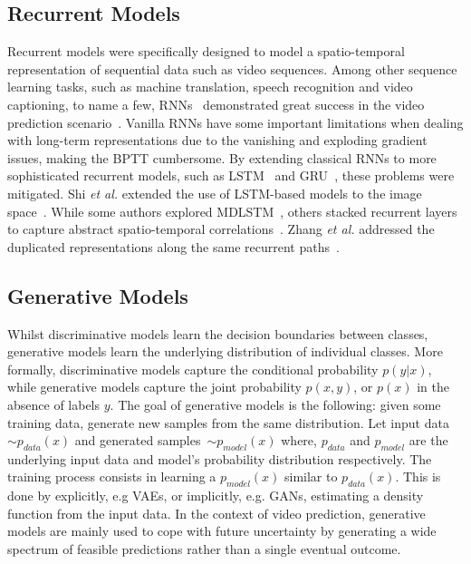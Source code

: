 \subsection{Recurrent Models}
Recurrent models were specifically designed to model a spatio-temporal representation of sequential data such as video sequences. Among other sequence learning tasks, such as machine translation, speech recognition and video captioning, to name a few, \acp{RNN}~\cite{Rumelhart1986} demonstrated great success in the video prediction scenario~\cite{Ranzato2014,Srivastava2015,Shi2015,Lotter2017,Lotter2015,Byeon2018, Zhang2019,Patraucean2015,Lu2017,Villegas2017,Denton2017,Chen2017,Oh2015,Denton2018,Villegas2017,Nabavi2018,Vora2018,Sun2019,Terwilliger2019,Wichers2018,Minderer2019}. Vanilla \acp{RNN} have some important limitations when dealing with long-term representations due to the vanishing and exploding gradient issues, making the \ac{BPTT} cumbersome. By extending classical \acp{RNN} to more sophisticated recurrent models, such as \ac{LSTM}~\cite{Hochreiter1997} and \ac{GRU}~\cite{Cho2014}, these problems were mitigated. Shi \textit{et al.} extended the use of \ac{LSTM}-based models to the image space~\cite{Shi2015}. While some authors explored \ac{MDLSTM}~\cite{Graves2007}, others stacked recurrent layers to capture abstract spatio-temporal correlations~\cite{Lotter2015,Finn2016}. Zhang \textit{et al.} addressed the duplicated representations along the same recurrent paths~\cite{Zhan2019}.

\subsection{Generative Models}
Whilst discriminative models learn the decision boundaries between classes, generative models learn the underlying distribution of individual classes. More formally, discriminative models capture the conditional probability $p(y|x)$, while generative models capture the joint probability $p(x,y)$, or $p(x)$ in the absence of labels $y$. The goal of generative models is the following: given some training data, generate new samples from the same distribution. Let input data~$\sim p_{data}(x)$ and generated samples~$\sim p_{model}(x)$ where, $p_{data}$ and $p_{model}$ are the underlying input data and model's probability distribution respectively. The training process consists in learning a $p_{model}(x)$ similar to $p_{data}(x)$. This is done by explicitly, e.g \acp{VAE}, or implicitly, e.g. \acp{GAN}, estimating a density function from the input data. In the context of video prediction, generative models are mainly used to cope with future uncertainty by generating a wide spectrum of feasible predictions rather than a single eventual outcome.

